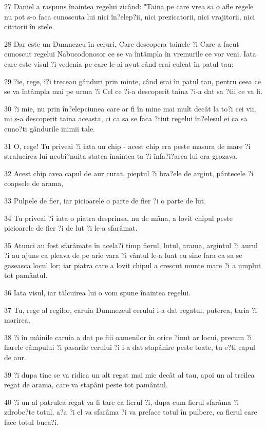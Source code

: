 \par 27 Daniel a raspuns înaintea regelui zicând: "Taina pe care vrea sa o afle regele nu pot s-o faca cunoscuta lui nici în?elep?ii, nici prezicatorii, nici vrajitorii, nici cititorii în stele.
\par 28 Dar este un Dumnezeu în ceruri, Care descopera tainele ?i Care a facut cunoscut regelui Nabucodonosor ce se va întâmpla în vremurile ce vor veni. Iata care este visul ?i vedenia pe care le-ai avut când erai culcat în patul tau:
\par 29 ?ie, rege, î?i treceau gânduri prin minte, când erai în patul tau, pentru ceea ce se va întâmpla mai pe urma ?i Cel ce ?i-a descoperit taina ?i-a dat sa ?tii ce va fi.
\par 30 ?i mie, nu prin în?elepciunea care ar fi în mine mai mult decât la to?i cei vii, mi s-a descoperit taina aceasta, ci ca sa se faca ?tiut regelui în?elesul ei ca sa cuno?ti gândurile inimii tale.
\par 31 O, rege! Tu priveai ?i iata un chip - acest chip era peste masura de mare ?i stralucirea lui neobi?nuita statea înaintea ta ?i înfa?i?area lui era grozava.
\par 32 Acest chip avea capul de aur curat, pieptul ?i bra?ele de argint, pântecele ?i coapsele de arama,
\par 33 Pulpele de fier, iar picioarele o parte de fier ?i o parte de lut.
\par 34 Tu priveai ?i iata o piatra desprinsa, nu de mâna, a lovit chipul peste picioarele de fier ?i de lut ?i le-a sfarâmat.
\par 35 Atunci au fost sfarâmate în acela?i timp fierul, lutul, arama, argintul ?i aurul ?i au ajuns ca pleava de pe arie vara ?i vântul le-a luat cu sine fara ca sa se gaseasca locul lor; iar piatra care a lovit chipul a crescut munte mare ?i a umplut tot pamântul.
\par 36 Iata visul, iar tâlcuirea lui o vom spune înaintea regelui.
\par 37 Tu, rege al regilor, caruia Dumnezeul cerului i-a dat regatul, puterea, taria ?i marirea,
\par 38 ?i în mâinile caruia a dat pe fiii oamenilor în orice ?inut ar locui, precum ?i fiarele câmpului ?i pasarile cerului ?i i-a dat stapânire peste toate, tu e?ti capul de aur.
\par 39 ?i dupa tine se va ridica un alt regat mai mic decât al tau, apoi un al treilea regat de arama, care va stapâni peste tot pamântul.
\par 40 ?i un al patrulea regat va fi tare ca fierul ?i, dupa cum fierul sfarâma ?i zdrobe?te totul, a?a ?i el va sfarâma ?i va preface totul în pulbere, ca fierul care face totul buca?i.
